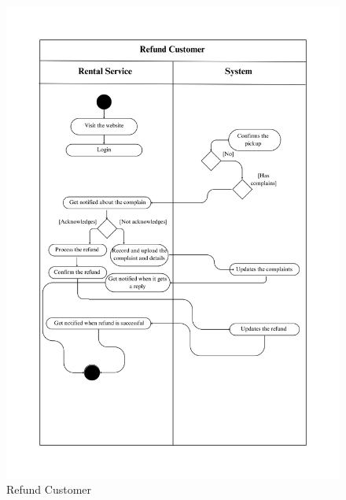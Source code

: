 \begin{figure}[h]
    \centering
    \includegraphics[width=1\textwidth]{Images/Activity Diagrams/36 Refund Customer.png}
    \caption{Refund Customer}
    \label{fig:activity-refund}
\end{figure}